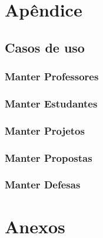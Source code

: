\chapter{Apêndice}
\clearpage
\section{Casos de uso}
\label{app:casos_de_uso}
\subsection{Manter Professores}


\clearpage
\subsection{Manter Estudantes}


\clearpage
\subsection{Manter Projetos}


\clearpage
\subsection{Manter Propostas}


\clearpage
\subsection{Manter Defesas}



\chapter{Anexos}
\clearpage
